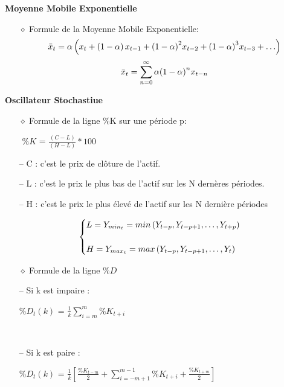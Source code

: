 \textbf{Moyenne Mobile Exponentielle}
\begin{itemize}
\item[$\diamond$] Formule de la Moyenne Mobile Exponentielle: \\
\begin{equation}
	\large{\bar{x}_t = \alpha\left( x_t + \left(1 - \alpha \right)x_{t-1} + {\left(1 - \alpha \right)}^2x_{t-2} + {\left(1 - \alpha \right)}^3x_{t-3} + \ldots \right)}
\end{equation}
\begin{equation}\large{\bar{x}_t = \sum_{n=0}^{\infty}\alpha{\left(1 - \alpha\right)}^nx_{t-n} } \end{equation}
\end{itemize}	

\textbf{Oscillateur Stochastiue} 
\begin{itemize}
\item[$\diamond$] Formule de la ligne \%K sur une période p:

\item[$ $] $\%K$ = ${\frac{(C - L)}{(H - L)}}*100$
\item[--] C : c'est le prix de clôture de l'actif.
\item[--] L : c'est le prix le plus bas de l'actif sur les N dernères périodes.
\item[--] H : c'est le prix le plus élevé de l'actif sur les N dernière périodes\\
\begin{large}
\begin{equation}
	\begin{cases}
		\large{L = Y_{min_t}  = min\left( Y_{t-p},Y_{t-p+1},\ldots,Y_{t+p} \right)}\\
		\\
		\large{H = Y_{max_t} = max\left( Y_{t-p},Y_{t-p+1},\ldots,Y_{t} \right)}
	\end{cases}
\end{equation}
\end{large}
\item[$\diamond$] Formule de la ligne $\%D$
\item[--] Si k est impaire : \begin{large} $\%D_t(k)$ = $\frac{1}{k}\sum_{i=m}^{m}\%K_{t+i}$\end{large}  \\
\item[--] Si k est paire : \begin{large}$\%D_t(k)$ = $\frac{1}{k}\left[\frac{\%K_{t-m}}{2}+ \sum_{i=-m+1}^{m-1}\%K_{t+i} + \frac{\%K_{t+m}}{2}\right]$\end{large}\\


\end{itemize}


